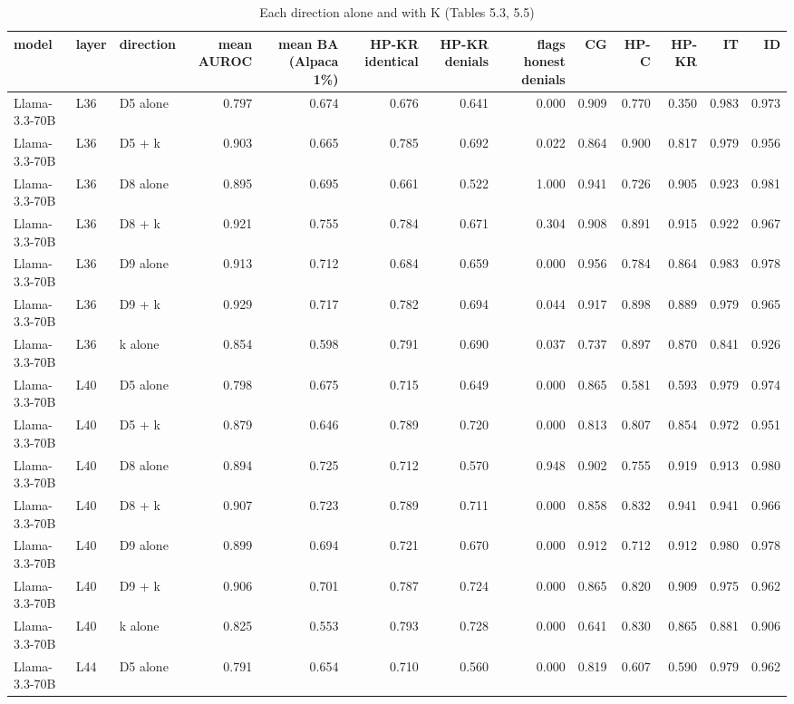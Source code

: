 \begin{table}
\caption{Each direction alone and with K (Tables 5.3, 5.5)}
\label{tab:x-knowledge}
\begin{tabular}{lllrrrrrrrrrr}
\toprule
model & layer & direction & mean AUROC & mean BA (Alpaca 1\%) & HP-KR identical & HP-KR denials & flags honest denials & CG & HP-C & HP-KR & IT & ID \\
\midrule
Llama-3.3-70B & L36 & D5 alone & 0.797 & 0.674 & 0.676 & 0.641 & 0.000 & 0.909 & 0.770 & 0.350 & 0.983 & 0.973 \\
Llama-3.3-70B & L36 & D5 + k & 0.903 & 0.665 & 0.785 & 0.692 & 0.022 & 0.864 & 0.900 & 0.817 & 0.979 & 0.956 \\
Llama-3.3-70B & L36 & D8 alone & 0.895 & 0.695 & 0.661 & 0.522 & 1.000 & 0.941 & 0.726 & 0.905 & 0.923 & 0.981 \\
Llama-3.3-70B & L36 & D8 + k & 0.921 & 0.755 & 0.784 & 0.671 & 0.304 & 0.908 & 0.891 & 0.915 & 0.922 & 0.967 \\
Llama-3.3-70B & L36 & D9 alone & 0.913 & 0.712 & 0.684 & 0.659 & 0.000 & 0.956 & 0.784 & 0.864 & 0.983 & 0.978 \\
Llama-3.3-70B & L36 & D9 + k & 0.929 & 0.717 & 0.782 & 0.694 & 0.044 & 0.917 & 0.898 & 0.889 & 0.979 & 0.965 \\
Llama-3.3-70B & L36 & k alone & 0.854 & 0.598 & 0.791 & 0.690 & 0.037 & 0.737 & 0.897 & 0.870 & 0.841 & 0.926 \\
Llama-3.3-70B & L40 & D5 alone & 0.798 & 0.675 & 0.715 & 0.649 & 0.000 & 0.865 & 0.581 & 0.593 & 0.979 & 0.974 \\
Llama-3.3-70B & L40 & D5 + k & 0.879 & 0.646 & 0.789 & 0.720 & 0.000 & 0.813 & 0.807 & 0.854 & 0.972 & 0.951 \\
Llama-3.3-70B & L40 & D8 alone & 0.894 & 0.725 & 0.712 & 0.570 & 0.948 & 0.902 & 0.755 & 0.919 & 0.913 & 0.980 \\
Llama-3.3-70B & L40 & D8 + k & 0.907 & 0.723 & 0.789 & 0.711 & 0.000 & 0.858 & 0.832 & 0.941 & 0.941 & 0.966 \\
Llama-3.3-70B & L40 & D9 alone & 0.899 & 0.694 & 0.721 & 0.670 & 0.000 & 0.912 & 0.712 & 0.912 & 0.980 & 0.978 \\
Llama-3.3-70B & L40 & D9 + k & 0.906 & 0.701 & 0.787 & 0.724 & 0.000 & 0.865 & 0.820 & 0.909 & 0.975 & 0.962 \\
Llama-3.3-70B & L40 & k alone & 0.825 & 0.553 & 0.793 & 0.728 & 0.000 & 0.641 & 0.830 & 0.865 & 0.881 & 0.906 \\
Llama-3.3-70B & L44 & D5 alone & 0.791 & 0.654 & 0.710 & 0.560 & 0.000 & 0.819 & 0.607 & 0.590 & 0.979 & 0.962 \\

\end{tabular}
\end{table}
